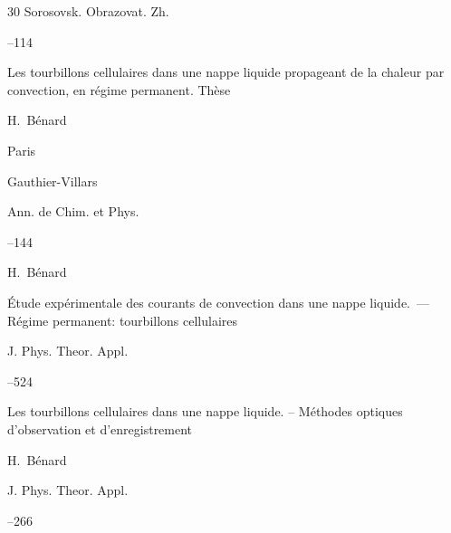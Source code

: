 {\begin{thebibliography}{30}
\jour Sorosovsk. Obrazovat. Zh. 




--114




\book Les tourbillons cellulaires dans une nappe liquide propageant de la chaleur par convection, en r\'egime permanent. Th\`ese

\by H.~B\'enard 



\publaddr Paris

\publ Gauthier-Villars

\moreref 

\jour Ann. de Chim. et Phys. 


--144 







\by H.~B\'enard 

\paper \'Etude exp\'erimentale des courants de convection dans une nappe liquide.~— R\'egime permanent: tourbillons cellulaires

\jour J. Phys. Theor. Appl.




--524











\paper Les tourbillons cellulaires dans une nappe liquide. -- M\'ethodes optiques d'ob\-ser\-va\-tion et d'enregistrement

\by H.~B\'enard

\jour J. Phys. Theor. Appl. 




--266


\end{thebibliography}}
